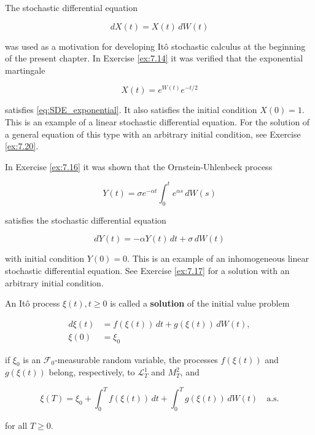 \begin{Example}
\label{ex:7-sde-example}
The stochastic differential equation

\begin{equation}
dX(t) = X(t) \, dW(t)
\label{eq:SDE_exponential}
\end{equation}

was used as a motivation for developing Itô stochastic calculus at the beginning of the present chapter. In Exercise \ref{ex:7.14} it was verified that the exponential martingale

\begin{equation}
X(t) = e^{W(t)} e^{-t/2}
\end{equation}

satisfies \eqref{eq:SDE_exponential}. It also satisfies the initial condition $X(0) = 1$. This is an example of a linear stochastic differential equation. For the solution of a general equation of this type with an arbitrary initial condition, see Exercise \ref{ex:7.20}.
\end{Example}

\begin{Example}
\label{ex:7-ou-process-example}
In Exercise \ref{ex:7.16} it was shown that the Ornstein-Uhlenbeck process

\begin{equation}
Y(t) = \sigma e^{-\alpha t} \int_0^t e^{\alpha s} \, dW(s)
\end{equation}

satisfies the stochastic differential equation

\begin{equation}
dY(t) = -\alpha Y(t) \, dt + \sigma \, dW(t)
\end{equation}

with initial condition $Y(0) = 0$. This is an example of an inhomogeneous linear stochastic differential equation. See Exercise \ref{ex:7.17} for a solution with an arbitrary initial condition.
\end{Example}

\begin{Definition}
\label{def:7.9}
An Itô process $\xi(t), t \geq 0$ is called a \textbf{solution} of the initial value problem

\begin{align}
d\xi(t) & = f(\xi(t)) \, dt + g(\xi(t)) \, dW(t), \label{eq:IVP_SDE} \\
\xi(0) & = \xi_0 \label{eq:IVP_initial}
\end{align}

if $\xi_0$ is an $\mathcal{F}_0$-measurable random variable, the processes $f(\xi(t))$ and $g(\xi(t))$ belong, respectively, to $\mathcal{L}_T^1$ and $M_T^2$, and

\begin{equation}
\xi(T) = \xi_0 + \int_0^T f(\xi(t)) \, dt + \int_0^T g(\xi(t)) \, dW(t) \quad \text{a.s.}
\label{eq:SDE_integral_form}
\end{equation}

for all $T \geq 0$.
\end{Definition}

